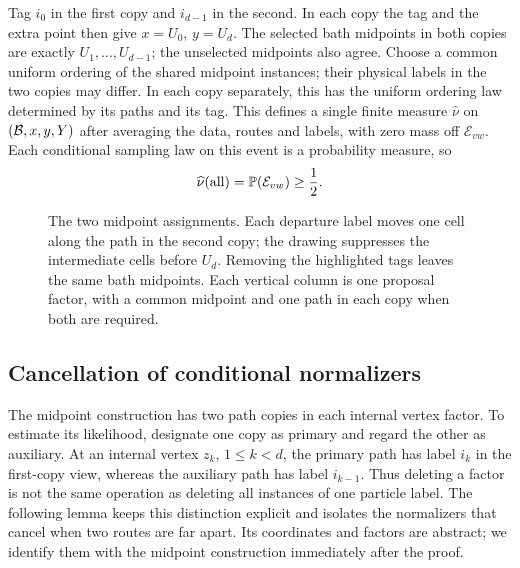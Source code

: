 Tag $i_0$ in the first copy and $i_{d-1}$ in the second. In each copy the
tag and the extra point then give $x=U_0$, $y=U_d$. The selected bath
midpoints in both copies are exactly $U_1,\ldots,U_{d-1}$; the unselected
midpoints also agree. Choose a common uniform ordering of the shared midpoint instances; their
physical labels in the two copies may differ. In each copy separately,
this has the uniform ordering law determined by its paths and its tag.
This defines a single finite measure $\widehat\nu$ on $(\mathcal B,x,y,Y)$ after
averaging the data, routes and labels, with zero mass off $\mathcal E_{vw}$.
Each conditional sampling law on this event is a probability measure, so
\begin{equation}\label{cmp:common-mass}
 \widehat\nu(\text{all})=\mathbb P(\mathcal E_{vw})\ge\frac12.
\end{equation}

\begin{figure}[t]
\centering
{}
\caption{The two midpoint assignments. Each departure label moves one cell
along the path in the second copy; the drawing suppresses the intermediate
cells before $U_d$. Removing the highlighted tags leaves the same bath
midpoints. Each vertical column is one proposal factor, with a common
midpoint and one path in each copy when both are required.}
\label{cmp:shift-figure}
\end{figure}

\subsection{Cancellation of conditional normalizers}

The midpoint construction has two path copies in each internal vertex
factor. To estimate its likelihood, designate one copy as primary and regard
the other as auxiliary. At an internal vertex $z_k$, $1\le k<d$, the
primary path has label $i_k$ in the first-copy view, whereas the auxiliary
path has label
$i_{k-1}$. Thus deleting a factor is not the same operation as deleting all
instances of one particle label. The following lemma keeps this distinction
explicit and isolates the normalizers that cancel when two routes are far
apart. Its coordinates and factors are abstract; we identify them with the
midpoint construction immediately after the proof.

